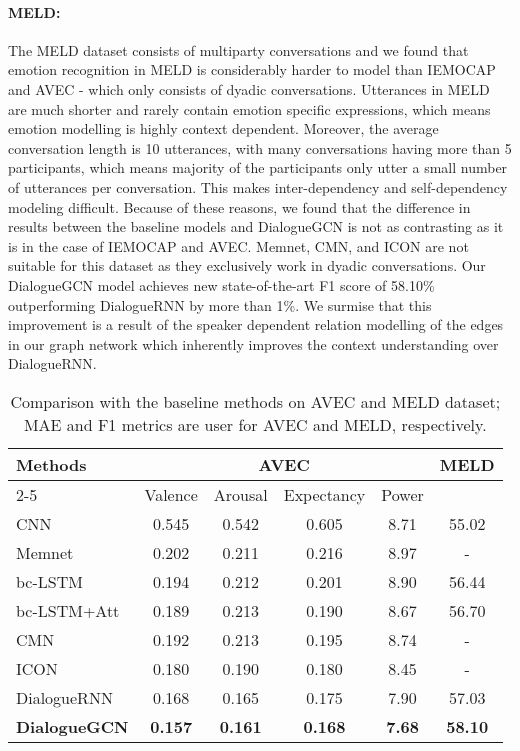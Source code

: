 \documentclass[11pt,a4paper]{article}
\begin{document}
\paragraph{MELD:} The MELD dataset consists of multiparty conversations and we found that emotion recognition in MELD is considerably harder to model than IEMOCAP and AVEC - which only consists of dyadic conversations. Utterances in MELD are much shorter and rarely contain emotion specific expressions, which means emotion modelling is highly context dependent. Moreover, the average conversation length is 10 utterances, with many conversations having more than 5 participants, which means majority of the participants only utter a small number of utterances per conversation. This makes inter-dependency and self-dependency modeling difficult.
Because of these reasons, we found that the difference in results between the baseline models and DialogueGCN is not as contrasting as it is in the case of IEMOCAP and AVEC. Memnet, CMN, and ICON are not suitable for this dataset as they exclusively work in dyadic conversations. Our DialogueGCN model achieves new state-of-the-art F1 score of 58.10\% outperforming DialogueRNN by more than 1\%. We surmise that this improvement is a result of the speaker dependent relation modelling of the edges in our graph network which inherently improves the context understanding over DialogueRNN.
\begin{table*}[t]
\centering
   \begin{tabular}{l||c@{~}c@{~}c@{~}c@{~}|c}
    \hline
    \multirow{3}{*}{Methods} & \multicolumn{4}{c|}{AVEC} & \multirow{2}{*}{MELD}\\
    \cline{2-5} &\multicolumn{1}{c}{Valence}& \multicolumn{1}{c}{Arousal}& \multicolumn{1}{c}{Expectancy} & \multicolumn{1}{c|}{Power}\\
\hline
    \hline
  CNN &0.545&0.542&0.605&8.71 & 55.02 \\
    Memnet &0.202 &0.211&0.216&8.97 & -\\
    bc-LSTM &0.194&0.212&0.201&8.90 & 56.44\\
    bc-LSTM+Att &0.189&0.213&0.190&8.67 & 56.70\\
    CMN &0.192&0.213&0.195&8.74 & -\\
    ICON & 0.180&0.190&0.180&8.45 & -\\
    DialogueRNN &0.168&0.165& 0.175&7.90 & 57.03\\
    \hline
    \textbf{DialogueGCN} &{\bf 0.157}&{\bf 0.161}&{\bf 0.168}&{\bf 7.68} & {\bf 58.10}\\
    \hline
   \end{tabular}
\caption{Comparison with the baseline methods on AVEC and MELD dataset; MAE and F1 metrics are user for AVEC and MELD, respectively.\label{results:AVEC}}
  \end{table*}
\end{document}
